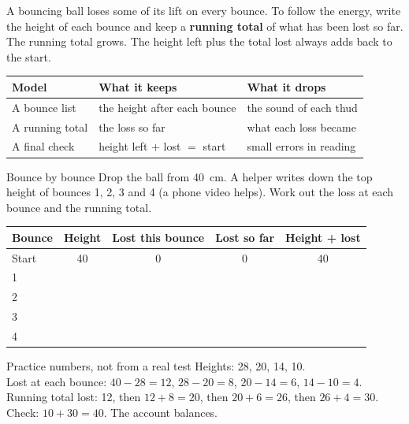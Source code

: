 \label{ch5}

A bouncing ball loses some of its lift on every bounce. To follow the energy, write the height of each bounce and keep a \textbf{running total} of what has been lost so far. The running total grows. The height left plus the total lost always adds back to the start.

\begin{center}
\sffamily\small\renewcommand{\arraystretch}{1.5}
\begin{tabular}{@{}p{3.4cm}p{3.7cm}p{3.7cm}@{}}
\toprule
\textbf{Model} & \textbf{What it keeps} & \textbf{What it drops}\\
\midrule
A bounce list & the height after each bounce & the sound of each thud\\
A running total & the loss so far & what each loss became\\
A final check & height left $+$ lost $=$ start & small errors in reading\\
\bottomrule
\end{tabular}
\end{center}

\begin{tryit}{Bounce by bounce}
Drop the ball from 40~cm. A helper writes down the top height of bounces 1, 2, 3 and 4 (a phone video helps). Work out the loss at each bounce and the running total.\par\medskip
\renewcommand{\arraystretch}{1.6}
\begin{tabular}{|l|c|c|c|c|}
\hline
\textbf{Bounce} & \textbf{Height} & \textbf{Lost this bounce} & \textbf{Lost so far} & \textbf{Height + lost}\\ \hline
Start & 40 & 0 & 0 & 40\\ \hline
1 & & & & \\ \hline
2 & & & & \\ \hline
3 & & & & \\ \hline
4 & & & & \\ \hline
\end{tabular}
\end{tryit}

\begin{worked}{Practice numbers, not from a real test}
Heights: 28, 20, 14, 10.\\
Lost at each bounce: $40-28=12$, $28-20=8$, $20-14=6$, $14-10=4$.\\
Running total lost: 12, then $12+8=20$, then $20+6=26$, then $26+4=30$.\\
Check: $10+30=40$. The account balances.
\end{worked}

